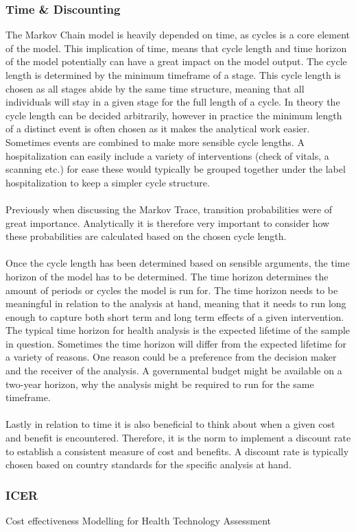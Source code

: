 \documentclass[a4paper,12pt]{article}
\begin{document}
\subsubsection*{Time \& Discounting}
The Markov Chain model is heavily depended on time, as cycles is a core element of the model. This implication of time, means that cycle length and time horizon of the model potentially can have a great impact on the model output. The cycle length is determined by the minimum timeframe of a stage. This cycle length is chosen as all stages abide by the same time structure, meaning that all individuals will stay in a given stage for the full length of a cycle. In theory the cycle length can be decided arbitrarily, however in practice the minimum length of a distinct event is often chosen as it makes the analytical work easier. Sometimes events are combined to make more sensible cycle lengths. A hospitalization can easily include a variety of interventions (check of vitals, a scanning etc.) for ease these would typically be grouped together under the label hospitalization to keep a simpler cycle structure. 
\\\\
Previously when discussing the Markov Trace, transition probabilities were of great importance. Analytically it is therefore very important to consider how these probabilities are calculated based on the chosen cycle length.
\\\\
Once the cycle length has been determined based on sensible arguments, the time horizon of the model has to be determined. The time horizon determines the amount of periods or cycles the model is run for. The time horizon needs to be meaningful in relation to the analysis at hand, meaning that it needs to run long enough to capture both short term and long term effects of a given intervention. The typical time horizon for health analysis is the expected lifetime of the sample in question. Sometimes the time horizon will differ from the expected lifetime for a variety of reasons. One reason could be a preference from the decision maker and the receiver of the analysis. A governmental budget might be available on a two-year horizon, why the analysis might be required to run for the same timeframe. 
\\\\
Lastly in relation to time it is also beneficial to think about when a given cost and benefit is encountered. Therefore, it is the norm to implement a discount rate to establish a consistent measure of cost and benefits. A discount rate is typically chosen based on country standards for the specific analysis at hand.

\subsubsection*{ICER}



\newpage
\begin{thebibliography}{9}

Cost effectiveness Modelling for Health Technology Assessment


\end{thebibliography}	
	
\end{document}
